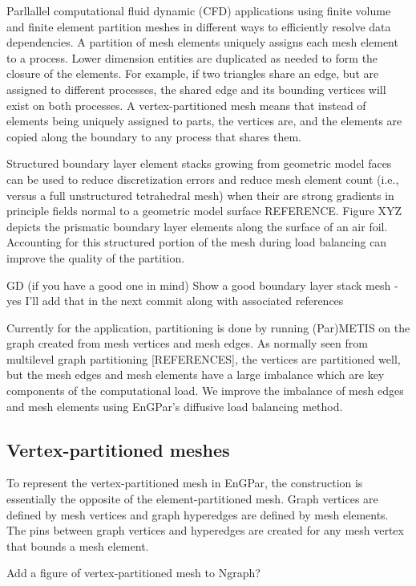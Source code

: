\documentclass[conference]{IEEEtran}
\begin{document}
Parllallel computational fluid dynamic (CFD) applications using
finite volume and finite element partition meshes in different
ways to efficiently resolve data dependencies.
A partition of mesh elements uniquely assigns each mesh element to a process.
Lower dimension entities are duplicated as needed to form the closure of the
elements.
For example, if two triangles share an edge, but are assigned to different
processes, the shared edge and its bounding vertices will exist on both
processes.
A vertex-partitioned mesh means that
instead of elements being uniquely assigned to parts, the vertices are, and the elements are
copied along the boundary to any process that shares them.

Structured boundary layer element stacks growing from geometric model faces can
be used to reduce discretization errors and reduce mesh element count (i.e., versus
a full unstructured tetrahedral mesh) when their are strong gradients in
principle fields normal to a geometric model surface {\color{red} REFERENCE}.
Figure XYZ depicts the prismatic boundary layer elements along the surface of an
air foil.
Accounting for this structured portion of the mesh during load balancing can
improve the quality of the partition.

{\color{red} GD (if you have a good one in mind) Show a good boundary layer
stack mesh - yes I'll add that in the next commit along with associated
references}

Currently for the application, partitioning is done by running (Par)METIS on the graph created
from mesh vertices and mesh edges. As normally seen from multilevel graph
partitioning [REFERENCES],
the vertices are partitioned well, but the mesh edges and mesh elements have a large
imbalance which are key components of the computational load. We improve the imbalance of
mesh edges and mesh elements using EnGPar's diffusive load balancing method.

\subsection{Vertex-partitioned meshes}

To represent the vertex-partitioned mesh in EnGPar, the construction
is essentially the opposite of the element-partitioned mesh. Graph
vertices are defined by mesh vertices and graph hyperedges are defined
by mesh elements. The pins between graph vertices and hyperedges are
created for any mesh vertex that bounds a mesh element.

{\color{red} Add a figure of vertex-partitioned mesh to Ngraph?}
\end{document}
